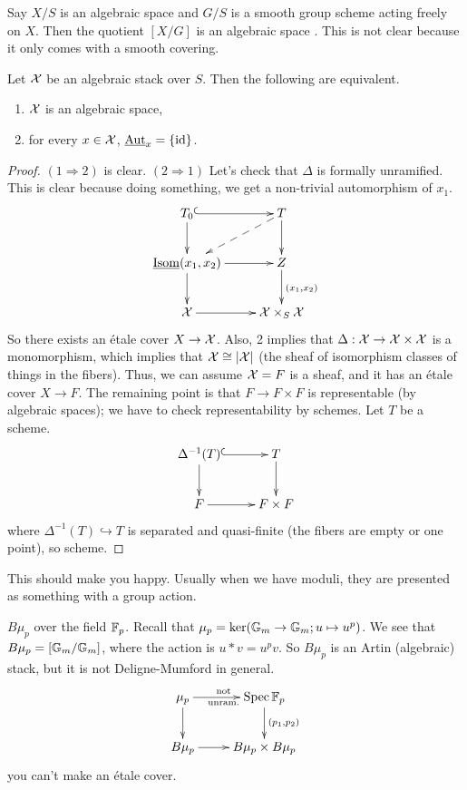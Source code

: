 
\begin{example}
 Say $X/S$ is an algebraic space and $G/S$ is a smooth group scheme
acting freely on $X$. Then the quotient $[X/G]$ is an algebraic space
. This is not clear because it only comes with a
smooth covering.
\end{example}
\begin{corollary}
 Let $\mathcal{X}$ be an algebraic stack over $S$. Then the following are
equivalent.
 \begin{enumerate}
   \item $\mathcal{X}$ is an algebraic space,
   \item for every $x\in \mathcal{X}$, $\operatorname{\underline{Aut}}_x=\{\operatorname{id}\}$.
 \end{enumerate}
\end{corollary}
\begin{proof}
 $(1\Rightarrow 2)$ is clear. $(2\Rightarrow 1)$ Let's check that
$\Delta$ is formally unramified. This is clear because doing
something, we get a non-trivial automorphism of $x_1$.
 \[\xymatrix{
  T_0\ar@{^(->}[r]\ar[d] & T\ar[d]\ar@{-->}[dl]\\
  \isom(x_1,x_2)\ar[d]\ar[r] & Z\ar[d]^{(x_1,x_2)}\\
  \X\ar[r] & \X\times_S \X
 }\]
 So there exists an \'etale cover $X\to \mathcal{X}$. Also, 2 implies that
$\Delta:\mathcal{X}\to \mathcal{X}\times \mathcal{X}$ is a monomorphism, which implies that
$\mathcal{X}\cong |\mathcal{X}|$ (the sheaf of isomorphism classes of things in the
fibers). Thus, we can assume $\mathcal{X}=F$ is a sheaf, and it has an \'etale
cover $X\to F$. The remaining point is that $F\to F\times F$ is
representable (by algebraic spaces); we have to check
representability by schemes. Let $T$ be a scheme.
 \[\xymatrix{
  \Delta^{-1}(T)\ar[d]\ar@{^(->}[r] & T\ar[d]\\
  F\ar[r] & F\times F
 }\]
 where $\Delta^{-1}(T)\hookrightarrow T$ is separated and
quasi-finite (the fibers are empty or one point), so scheme.
\end{proof}
This should make you happy. Usually when we have moduli, they are
presented as something with a group action.
\begin{example}
 $B\mu_p$ over the field $\mathbb{F}_p$. Recall that $\mu_p=\ker(\mathbb{G}_m\to
\mathbb{G}_m;u\mapsto u^p)$. We see that $B\mu_p=[\mathbb{G}_m/\mathbb{G}_m]$, where the
action is $u\ast v=u^pv$. So $B\mu_p$ is an Artin (algebraic) stack,
but it is not Deligne-Mumford in general.
 \[\xymatrix{
  \mu_p\ar[d]\ar[r]^{\text{not}}_{\text{unram.}} & \spec
\FF_p\ar[d]^{(p_1,p_2)} \\
  B\mu_p\ar[r] & B\mu_p\times B\mu_p
 }\]
 you can't make an \'etale cover.
\end{example}

